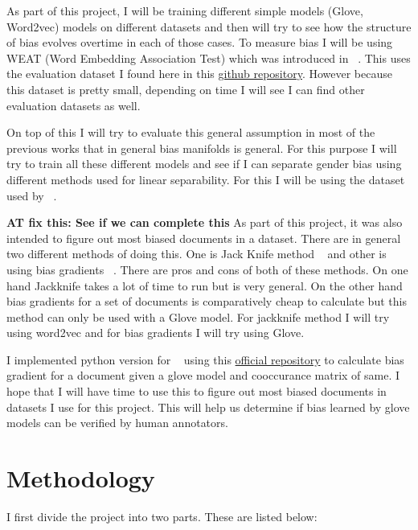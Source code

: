 \documentclass{article}
\def\at#1{{\color{red}\textbf{AT fix this: #1}}\xspace}
\begin{document}
As part of this project, I will be training different simple models (Glove, Word2vec) models on different datasets and then will try to see how the structure of bias evolves overtime in each of those cases. To measure bias I will be using WEAT (Word Embedding Association Test) which was introduced in ~\cite{caliskan_semantics_2017}. This uses the evaluation dataset I found here in this \href{https://github.com/chadaeun/weat_replication/tree/master/weat}{github repository}. However because this dataset is pretty small, depending on time I will see I can find other evaluation datasets as well.

On top of this I will try to evaluate this general assumption in most of the previous works that in general bias manifolds is general. For this purpose I will try to train all these different models and see if I can separate gender bias using different methods used for linear separability. For this I will be using the dataset used by ~\cite{garg_word_2018}.

\at{See if we can complete this}
As part of this project, it was also intended to figure out most biased documents in a dataset. There are in general two different methods of doing this. One is Jack Knife method ~\cite{https://doi.org/10.48550/arxiv.1709.06183} and other is using bias gradients ~\cite{brunet_understanding_2019}. There are pros and cons of both of these methods. On one hand Jackknife takes a lot of time to run but is very general. On the other hand bias gradients for a set of documents is comparatively cheap to calculate but this method can only be used with a Glove model.
For jackknife method I will try using word2vec and for bias gradients I will try using Glove.

I implemented python version for ~\cite{brunet_understanding_2019} using this \href{https://github.com/mebrunet/understanding-bias}{official repository} to calculate bias gradient for a document given a glove model and cooccurance matrix of same. I hope that I will have time to use this to figure out most biased documents in datasets I use for this project. This will help us determine if bias learned by glove models can be verified by human annotators.




\section{Methodology}

I first divide the project into two parts. These are listed below:
\end{document}
